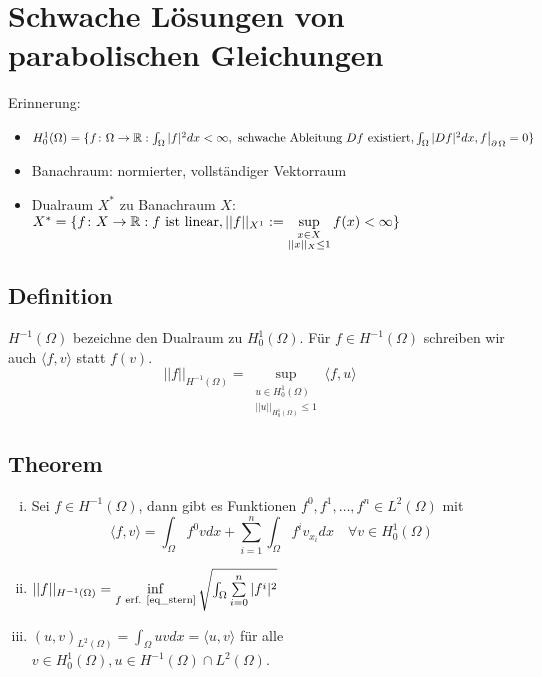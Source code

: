 \section{Schwache Lösungen von parabolischen Gleichungen}
\label{sec:para12}
	
Erinnerung: \begin{itemize}
	\item $H_0^1(\Omega) = \{ f \colon \Omega \rightarrow \mathbb{R} : \int_{\Omega} |f|^2 dx < \infty, \text{ schwache Ableitung } Df \text{ existiert}, \int_{\Omega} |Df|^2 dx, f \big|_{\operatorname{\partial} \Omega} = 0\}$
	\item Banachraum: normierter, vollständiger Vektorraum
	\item Dualraum $X^*$ zu Banachraum $X$: $X^* = \{f \colon X \rightarrow \mathbb{R} : f \text{ ist linear}, ||f||_{X^1} := \sup\limits_{\substack{x \in X \\ ||x||_X \leq 1}} f(x) < \infty\}$
	\end{itemize}
	
\subsection{Definition}
	$H^{-1}(\Omega)$ bezeichne den Dualraum zu $H_0^1(\Omega)$. Für $f \in H^{-1}(\Omega)$ schreiben wir auch $\langle f,v \rangle$ statt $f(v)$.
	\[ ||f||_{H^{-1}(\Omega)} = \sup\limits_{\substack{u \in H_0^1(\Omega) \\ ||u||_{H_0^1(\Omega)} \leq 1}} \langle f,u \rangle \]
	
\subsection{Theorem}
	\begin{enumerate}[(i)]
		\item Sei $f \in H^{-1}(\Omega)$, dann gibt es Funktionen $f^0,f^1,\dots,f^n \in L^2(\Omega)$ mit
		\begin{equation}
			\langle f,v \rangle = \int_{\Omega} f^0 v dx + \sum\limits_{i=1}^{n} \int_{\Omega} f^i v_{x_i} dx \quad \forall v \in H_0^1(\Omega) \label{eq_stern}
		\end{equation}
		\item $||f||_{H^{-1}(\Omega)} = \inf\limits_{f \text{ erf. \eqref{eq_stern}}} \sqrt{\int_{\Omega} \sum\limits_{i=0}^{n} |f^i|^2}$
		\item $(u,v)_{L^2(\Omega)} = \int_{\Omega} uvdx = \langle u,v \rangle$ für alle $v \in H_0^1(\Omega), u \in H^{-1}(\Omega) \cap L^2(\Omega)$.
	\end{enumerate}
	
